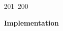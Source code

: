 201~200~\documentclass{article}
\begin{document}
\begin{itemize}
	                                                                                                                                                                                                                                                                                                	                                                                                                                                        	    	                                                                                                	                                                                                                                                                                                                                                                                                                                                	                                                                        	                                                                        	                                                                                                        \end{itemize}

	                                                                                                                                                                                                                                                                                                	                                                                                                                                        	    	                                                                                                	                                                                                                                                                                                                                                                                                                                                	                                                                        	                                                                        	                                                                                                        \textbf{Implementation}
\end{document}

